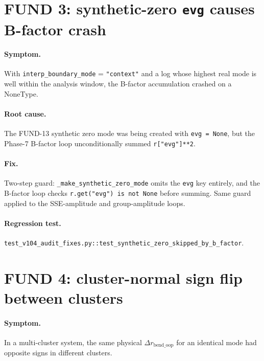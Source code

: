 \documentclass[10pt,a4paper,twoside]{article}
\newcommand{\fn}[1]{\texttt{#1}}
\newcommand{\cfgkey}[1]{\texttt{#1}}
\begin{document}
\section{FUND 3: synthetic-zero \texttt{evg} causes B-factor crash}
\label{sec:fund-3}

\paragraph{Symptom.}
With \cfgkey{interp\_boundary\_mode} = \texttt{"context"} and a log
whose highest real mode is well within the analysis window, the
B-factor accumulation crashed on a NoneType.

\paragraph{Root cause.}
The FUND-13 synthetic zero mode was being created with
\texttt{evg = None}, but the Phase-7 B-factor loop
unconditionally summed \texttt{r["evg"]**2}.

\paragraph{Fix.}
Two-step guard: \fn{\_make\_synthetic\_zero\_mode} omits the
\texttt{evg} key entirely, and the B-factor loop checks
\texttt{r.get("evg") is not None} before summing. Same guard
applied to the SSE-amplitude and group-amplitude loops.

\paragraph{Regression test.}
\fn{test\_v104\_audit\_fixes.py::test\_synthetic\_zero\_skipped\_by\_b\_factor}.

\section{FUND 4: cluster-normal sign flip between clusters}
\label{sec:fund-4}

\paragraph{Symptom.}
In a multi-cluster system, the same physical
$\Delta r_\text{bend\_oop}$ for an identical mode had opposite
signs in different clusters.
\end{document}
